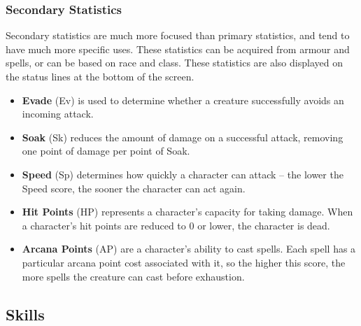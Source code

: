 \subsubsection{Secondary Statistics}

Secondary statistics are much more focused than primary statistics, and
tend to have much more specific uses.  These statistics can be acquired
from armour and spells, or can be based on race and class.  These
statistics are also displayed on the status lines at the bottom of the
screen.

\begin{itemize}
\item {\bf Evade} (Ev) is used to determine whether a creature successfully
avoids an incoming attack.

\item {\bf Soak} (Sk) reduces the amount of damage on a successful attack,
removing one point of damage per point of Soak.

\item {\bf Speed} (Sp) determines how quickly a character can attack -- the
lower the Speed score, the sooner the character can act again.

\item {\bf Hit Points} (HP) represents a character's capacity for taking 
damage.  When a character's hit points are reduced to 0 or lower, the 
character is dead.

\item {\bf Arcana Points} (AP) are a character's ability to cast spells.  
Each spell has a particular arcana point cost associated with it, so the 
higher this score, the more spells the creature can cast before exhaustion.
\end{itemize}

\subsection{Skills}

